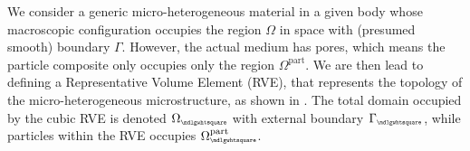 \documentclass[12pt,a4paper]{article}
\renewcommand{\Box}{\mdlgwhtsquare}
\newcommand{\particle}{\mathrm{part}}
\newcommand{\rve}{
  {\mathchoice
   {\mbox{\scalebox{0.67}{$\Box$}}}
   {\mbox{\scalebox{0.67}{$\Box$}}}
   {\mbox{\scalebox{0.5}{$\Box$}}}
   {\mbox{\scalebox{0.375}{$\Box$}}}
  }
}
\begin{document}
We consider a generic micro-heterogeneous material in a given body whose macroscopic configuration occupies the region $\Omega$ in space with (presumed smooth) boundary $\Gamma$.
However, the actual medium has pores, which means the particle composite only occupies only the region $\Omega^\particle$.
We are then lead to defining a Representative Volume Element (RVE), that represents the topology of the micro-heterogeneous microstructure, as shown in .
The total domain occupied by the cubic RVE is denoted $\Omega_\rve$ with external boundary $\Gamma_\rve$, while particles within the RVE occupies $\Omega_\rve^\particle$.
\begin{figure}
\centering
\end{figure}
\end{document}
